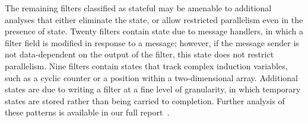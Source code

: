 The remaining filters classified as stateful may be amenable to
additional analyses that either eliminate the state, or allow
restricted parallelism even in the presence of state.  Twenty filters
contain state due to message handlers, in which a filter field is
modified in response to a message; however, if the message sender is
not data-dependent on the output of the filter, this state does not
restrict parallelism.  Nine filters contain states that track complex
induction variables, such as a cyclic counter or a position within a
two-dimensional array.  Additional states are due to writing a filter
at a fine level of granularity, in which temporary states are stored
rather than being carried to completion.  Further analysis of these
patterns is available in our full report~\cite{thies-thesis}.



